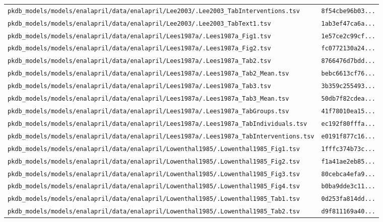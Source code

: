 \begin{longtable}{ll}
\texttt{pkdb\_models/models/enalapril/data/enalapril/Lee2003/.Lee2003\_TabInterventions.tsv} & \texttt{8f54cbe96b03...} \\
\texttt{pkdb\_models/models/enalapril/data/enalapril/Lee2003/.Lee2003\_TabText1.tsv} & \texttt{1ab3ef47ca6a...} \\
\texttt{pkdb\_models/models/enalapril/data/enalapril/Lees1987a/.Lees1987a\_Fig1.tsv} & \texttt{1e57ce2c99cf...} \\
\texttt{pkdb\_models/models/enalapril/data/enalapril/Lees1987a/.Lees1987a\_Fig2.tsv} & \texttt{fc0772130a24...} \\
\texttt{pkdb\_models/models/enalapril/data/enalapril/Lees1987a/.Lees1987a\_Tab2.tsv} & \texttt{8766476d7bdd...} \\
\texttt{pkdb\_models/models/enalapril/data/enalapril/Lees1987a/.Lees1987a\_Tab2\_Mean.tsv} & \texttt{bebc6613cf76...} \\
\texttt{pkdb\_models/models/enalapril/data/enalapril/Lees1987a/.Lees1987a\_Tab3.tsv} & \texttt{3b359c255493...} \\
\texttt{pkdb\_models/models/enalapril/data/enalapril/Lees1987a/.Lees1987a\_Tab3\_Mean.tsv} & \texttt{50db7f82cdea...} \\
\texttt{pkdb\_models/models/enalapril/data/enalapril/Lees1987a/.Lees1987a\_TabGroups.tsv} & \texttt{41f78010ea15...} \\
\texttt{pkdb\_models/models/enalapril/data/enalapril/Lees1987a/.Lees1987a\_TabIndividuals.tsv} & \texttt{ec192f80fffa...} \\
\texttt{pkdb\_models/models/enalapril/data/enalapril/Lees1987a/.Lees1987a\_TabInterventions.tsv} & \texttt{e0191f877c16...} \\
\texttt{pkdb\_models/models/enalapril/data/enalapril/Lowenthal1985/.Lowenthal1985\_Fig1.tsv} & \texttt{1fffc374b73c...} \\
\texttt{pkdb\_models/models/enalapril/data/enalapril/Lowenthal1985/.Lowenthal1985\_Fig2.tsv} & \texttt{f1a41ae2eb85...} \\
\texttt{pkdb\_models/models/enalapril/data/enalapril/Lowenthal1985/.Lowenthal1985\_Fig3.tsv} & \texttt{80cebca4efa9...} \\
\texttt{pkdb\_models/models/enalapril/data/enalapril/Lowenthal1985/.Lowenthal1985\_Fig4.tsv} & \texttt{b0ba9dde3c11...} \\
\texttt{pkdb\_models/models/enalapril/data/enalapril/Lowenthal1985/.Lowenthal1985\_Tab1.tsv} & \texttt{0d253fa814dd...} \\
\texttt{pkdb\_models/models/enalapril/data/enalapril/Lowenthal1985/.Lowenthal1985\_Tab2.tsv} & \texttt{d9f811169a40...} \\

\end{longtable}
